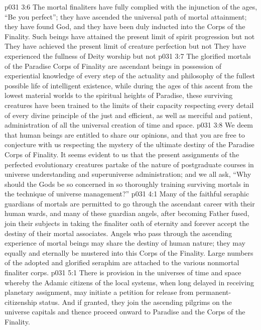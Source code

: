 \pc \vs p031 3:6 \bibnobreakspace The mortal finaliters have fully complied with the injunction of the ages, “Be you perfect”; they have ascended the universal path of mortal attainment; they have found God, and they have been duly inducted into the Corps of the Finality. Such beings have attained the present limit of spirit progression but not  They have achieved the present limit of creature perfection but not  They have experienced the fullness of Deity worship but not 
\pc \vs p031 3:7 \bibnobreakspace The glorified mortals of the Paradise Corps of Finality are ascendant beings in possession of experiential knowledge of every step of the actuality and philosophy of the fullest possible life of intelligent existence, while during the ages of this ascent from the lowest material worlds to the spiritual heights of Paradise, these surviving creatures have been trained to the limits of their capacity respecting every detail of every divine principle of the just and efficient, as well as merciful and patient, administration of all the universal creation of time and space.
\pc \vs p031 3:8 We deem that human beings are entitled to share our opinions, and that you are free to conjecture with us respecting the mystery of the ultimate destiny of the Paradise Corps of Finality. It seems evident to us that the present assignments of the perfected evolutionary creatures partake of the nature of postgraduate courses in universe understanding and superuniverse administration; and we all ask, “Why should the Gods be so concerned in so thoroughly training surviving mortals in the technique of universe management?”
\vs p031 4:1 Many of the faithful seraphic guardians of mortals are permitted to go through the ascendant career with their human wards, and many of these guardian angels, after becoming Father fused, join their subjects in taking the finaliter oath of eternity and forever accept the destiny of their mortal associates. Angels who pass through the ascending experience of mortal beings may share the destiny of human nature; they may equally and eternally be mustered into this Corps of the Finality. Large numbers of the adopted and glorified seraphim are attached to the various nonmortal finaliter corps.
\vs p031 5:1 There is provision in the universes of time and space whereby the Adamic citizens of the local systems, when long delayed in receiving planetary assignment, may initiate a petition for release from permanent\hyp{}citizenship status. And if granted, they join the ascending pilgrims on the universe capitals and thence proceed onward to Paradise and the Corps of the Finality.\plusone

